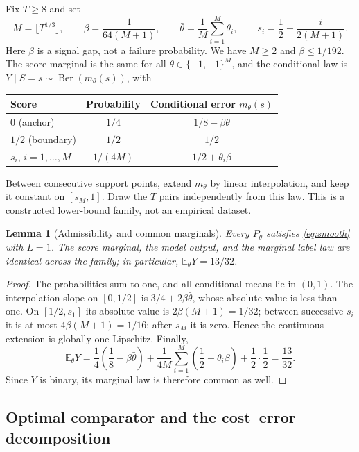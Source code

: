 \documentclass[11pt]{article}
\newtheorem{lemma}[theorem]{Lemma}
\theoremstyle{remark}
\newcommand{\E}{\mathbb E}
\newcommand{\Ber}{\operatorname{Ber}}
\begin{document}
Fix $T\ge8$ and set
\begin{equation}
 M=\lfloor T^{1/3}\rfloor,\qquad
 \beta=\frac1{64(M+1)},\qquad
 \bar\theta=\frac1M\sum_{i=1}^M\theta_i,\qquad
 s_i=\frac12+\frac{i}{2(M+1)}.
 \label{eq:parameters}
\end{equation}
Here $\beta$ is a signal gap, not a failure probability. We have
$M\ge2$ and $\beta\le1/192$. The score marginal is the same for all
$\theta\in\{-1,+1\}^M$, and the conditional law is
$Y\mid S=s\sim\Ber(m_\theta(s))$, with
\begin{center}
\begin{tabular}{@{}lcc@{}}
\toprule
Score & Probability & Conditional error $m_\theta(s)$\\
\midrule
$0$ (anchor) & $1/4$ & $1/8-\beta\bar\theta$\\[2pt]
$1/2$ (boundary) & $1/2$ & $1/2$\\[2pt]
$s_i$, $i=1,\ldots,M$ & $1/(4M)$ & $1/2+\theta_i\beta$\\
\bottomrule
\end{tabular}
\end{center}
Between consecutive support points, extend $m_\theta$ by linear
interpolation, and keep it constant on $[s_M,1]$. Draw the $T$ pairs
independently from this law. This is a constructed lower-bound family,
not an empirical dataset.

\begin{lemma}[Admissibility and common marginals]
\label{lem:family}
Every $P_\theta$ satisfies \eqref{eq:smooth} with $L=1$. The score marginal, the
model output, and the marginal label law are identical across the family;
in particular, $\E_\theta Y=13/32$.
\end{lemma}
\begin{proof}
The probabilities sum to one, and all conditional means lie in $(0,1)$.
The interpolation slope on $[0,1/2]$ is
$3/4+2\beta\bar\theta$, whose absolute value is less than one.
On $[1/2,s_1]$ its absolute value is $2\beta(M+1)=1/32$;
between successive $s_i$ it is at most $4\beta(M+1)=1/16$;
after $s_M$ it is zero. Hence the continuous extension is globally
one-Lipschitz. Finally,
\[
 \E_\theta Y
 =\frac14\left(\frac18-\beta\bar\theta\right)
  +\frac1{4M}\sum_{i=1}^M\left(\frac12+\theta_i\beta\right)
  +\frac12\cdot\frac12
 =\frac{13}{32}.
\]
Since $Y$ is binary, its marginal law is therefore common as well.
\end{proof}

\subsection{Optimal comparator and the cost--error decomposition}
\end{document}
